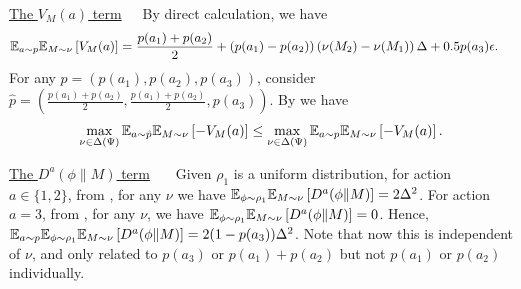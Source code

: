 \noindent\underline{The $V_M(a)$ term}\ \ \ 
By direct calculation, we have 
\begin{align}
    &\mathbb{E}_{a\sim p} \mathbb{E}_{M\sim \nu} \left[V_M (a) \right]= \frac{p(a_1) + p(a_2)}{2} + \left(p(a_1) - p(a_2)\right)\left(\nu(M_2) - \nu(M_1)\right)\Delta + 0.5p(a_3)\epsilon. \label{eq: temp 111} 
\end{align}
For any $p = (p(a_1), p(a_2), p(a_3))$, consider $\hat{p} = (\frac{p(a_1) + p(a_2)}{2}, \frac{p(a_1) + p(a_2)}{2}, p(a_3))$. By  we have
\begin{align}
    \max_{\nu \in \Delta(\Psi)}\mathbb{E}_{a\sim \hat{p}} \mathbb{E}_{M\sim \nu} \left[-V_M (a)\right] \leq \max_{\nu \in \Delta(\Psi)}\mathbb{E}_{a\sim p} \mathbb{E}_{M\sim \nu} \left[-V_M (a)\right]. 
\label{eq:modify_p}
\end{align}

\noindent\underline{The $D^a(\phi\|M)$ term} \ \ \ Given $\rho_1$ is a uniform distribution, for action $a \in \{1,2\}$, from , for any $\nu$  we have $\mathbb{E}_{\phi \sim \rho_1}\mathbb{E}_{M \sim \nu}\left[D^a(\phi\|M)\right] = 2\Delta^2$. For action $a = 3$, from , for any $\nu$,  we have $\mathbb{E}_{\phi \sim \rho_1}\mathbb{E}_{M \sim \nu}\left[D^a(\phi\|M)\right] = 0$. Hence, $\mathbb{E}_{a\sim p}\mathbb{E}_{\phi \sim \rho_1}\mathbb{E}_{M \sim \nu}\left[D^a(\phi\|M)\right] = 2(1-p(a_3))\Delta^2$.  Note that now this is independent of  $\nu$, and only related to $p(a_3)$ or $p(a_1) + p(a_2)$ but not $p(a_1)$ or $p(a_2)$ individually. \\



